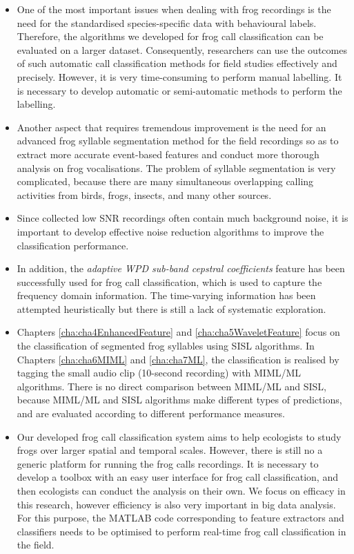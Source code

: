 \begin{itemize}
\item  One of the most important issues when dealing with frog recordings is the need for the standardised species-specific data with behavioural labels. 
Therefore, the algorithms we developed for frog call classification can be evaluated on a larger dataset. Consequently, researchers can use the outcomes of such automatic call classification methods for field studies effectively and precisely. However, it is very time-consuming to perform manual labelling. It is necessary to develop automatic or semi-automatic methods to perform the labelling.

\item  Another aspect that requires tremendous improvement is the need for an advanced frog syllable segmentation method for the field recordings so as to extract more accurate event-based features and conduct more thorough analysis on frog vocalisations. The problem of syllable segmentation is very complicated, because there are many simultaneous overlapping calling activities from birds, frogs, insects, and many other sources. 

\item Since collected low SNR recordings often contain much background noise, it is important to develop effective noise reduction algorithms to improve the classification performance.




\item In addition, the \textit{adaptive WPD sub-band cepstral coefficients} feature has been successfully used for frog call classification, which is used to capture the frequency domain information. The time-varying information has been attempted heuristically but there is still a lack of systematic exploration. 



\item Chapters \ref{cha:cha4EnhancedFeature} and \ref{cha:cha5WaveletFeature} focus on the classification of segmented frog syllables using SISL algorithms. In Chapters \ref{cha:cha6MIML} and \ref{cha:cha7ML}, the classification is realised by tagging the small audio clip (10-second recording) with MIML/ML algorithms. There is no direct comparison between MIML/ML and SISL, because MIML/ML and SISL algorithms make different types of predictions, and are evaluated according to different performance measures.



\item Our developed frog call classification system aims to help ecologists to study frogs over larger spatial and temporal scales. However, there is still no a generic platform for running the frog calls recordings. It is necessary to develop a toolbox with an easy user interface for frog call classification, and then ecologists can conduct the analysis on their own. 
We focus on efficacy in this research, however efficiency is also very important in big data analysis. For this purpose, the MATLAB code corresponding to feature extractors and classifiers needs to be optimised to perform real-time frog call classification in the field.



\end{itemize}
